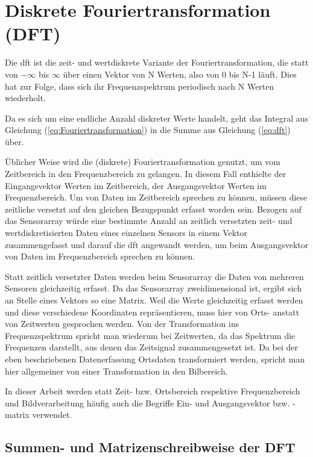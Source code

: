 \section{Diskrete Fouriertransformation (DFT)}

Die \gls{dft} ist die zeit- und wertdiskrete Variante der Fouriertransformation, die statt von $-\infty$ bis $\infty$ über einen Vektor von N Werten, also von 0 bis N-1 läuft. 
Dies hat zur Folge, dass sich ihr Frequenzspektrum periodisch nach N Werten wiederholt.

Da es sich um eine endliche Anzahl diskreter Werte handelt, geht das Integral aus Gleichung (\ref{eq:Fouriertransformation}) in die Summe aus Gleichung (\ref{eq:dft}) über. 


Üblicher Weise wird die (diskrete) Fouriertransformation genutzt, um vom Zeitbereich in den Frequenzbereich zu gelangen. In diesem Fall enthielte der Eingangsvektor 
Werten im Zeitbereich, der Ausgangsvektor Werten im Frequenzbereich.
Um von Daten im Zeitbereich sprechen zu können, müssen diese zeitliche versetzt auf den gleichen Bezugspunkt erfasst worden sein. 
Bezogen auf das Sensorarray würde eine bestimmte Anzahl an zeitlich versetzten zeit- und wertdiskretisierten Daten eines einzelnen Sensors in einem Vektor zusammengefasst 
und darauf die \gls{dft} angewandt werden, um beim Ausgangsvektor von Daten im Frequenzbereich sprechen zu können.

Statt zeitlich versetzter Daten werden beim Sensorarray die Daten von mehreren Sensoren gleichzeitig erfasst. Da das Sensorarray zweidimensional ist, ergibt
sich an Stelle eines Vektors so eine Matrix. Weil die Werte gleichzeitig erfasst werden und diese verschiedene Koordinaten repräsentieren, muss hier von Orts- anstatt von
Zeitwerten gesprochen werden. Von der Transformation ins Frequenzspektrum spricht man wiederum bei Zeitwerten, da das Spektrum die Frequenzen darstellt, aus denen das Zeitsignal 
zusammengesetzt ist. Da bei der eben beschriebenen Datenerfassung Ortsdaten transformiert werden, spricht man hier allgemeiner von einer Transformation in den Bilbereich. 

In dieser Arbeit werden statt Zeit- bzw. Ortsbereich respektive Frequenzbereich und Bildverarbeitung häufig auch die Begriffe Ein- und Ausgangsvektor bzw. -matrix verwendet.




\subsection{Summen- und Matrizenschreibweise der DFT}
